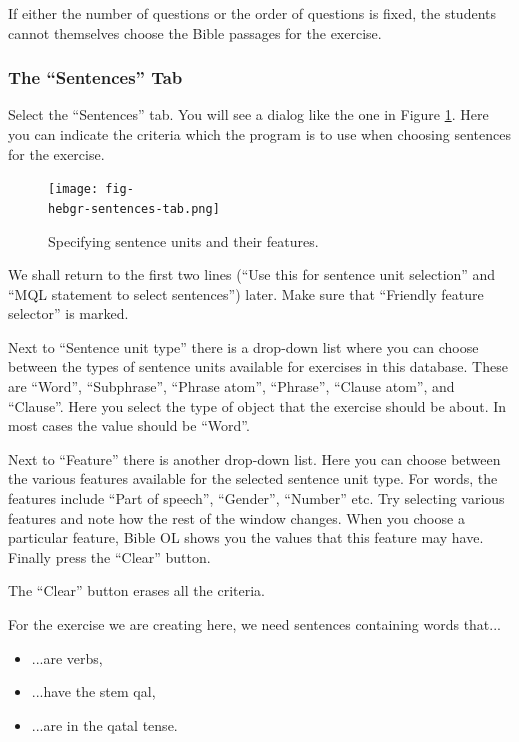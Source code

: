 \documentclass[11pt,oneside,a4paper]{memoir}
\newcommand{\hebgr}{}   %
\begin{document}
{If either the number of questions or the order of questions is fixed, the students cannot themselves
choose the Bible passages for the exercise.


\subsubsection{The ``Sentences'' Tab}

Select the ``Sentences'' tab. You will see a dialog like the one in Figure
\ref{fig-\hebgr-sentences-tab}. Here you can indicate the criteria which the program is to use when
choosing sentences for the exercise.

\begin{figure}
  \begin{center}
    \texttt{[image: fig-\\hebgr-sentences-tab.png]}
  \end{center}
  \caption{Specifying sentence units and their features.}\label{fig-\hebgr-sentences-tab}
\end{figure}


We shall return to the first two lines (``Use this for sentence unit selection'' and ``MQL statement
to select sentences'') later. Make sure that ``Friendly feature selector'' is marked.

Next to ``Sentence unit type'' there is a drop-down list where you can choose between the types of
sentence units available for exercises in this database. These are ``Word'', ``Subphrase'', ``Phrase
atom'', ``Phrase'', ``Clause atom'', and ``Clause''. Here you select the type of object that the
exercise should be about. In most cases the value should be ``Word''.

Next to ``Feature'' there is another drop-down list. Here you can choose between the various
features available for the selected sentence unit type. For words, the features include ``Part of
speech'', ``Gender'', ``Number'' etc. Try selecting various features and note how the rest of the
window changes. When you choose a particular feature, Bible OL shows you the values that this
feature may have. Finally press the ``Clear'' button.

The ``Clear'' button erases all the criteria.

\begin{samepage}
For the exercise we are creating here, we need sentences containing words that...

\begin{itemize}[\null]
  \item ...are verbs,
  \item ...have the stem qal,
  \item ...are in the qatal tense.
\end{itemize}
\end{samepage}

}
\end{document}
